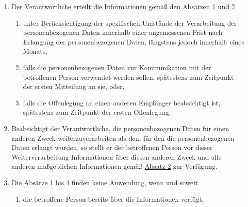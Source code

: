 \begin{enumerate}
\begin{enumerate}
  \end{enumerate}

  \item Der Verantwortliche erteilt die Informationen gemäß den Absätzen \hyperref[itm:14-1]{1} und \hyperref[itm:14-2]
  {2}
  \label{itm:14-3}

  \begin{enumerate}
  
    \item unter Berücksichtigung der spezifischen Umstände der Verarbeitung der personenbezogenen Daten innerhalb einer
     angemessenen Frist nach Erlangung der personenbezogenen Daten, längstens jedoch innerhalb eines Monats,
    \label{itm:14-3a}

    \item falls die personenbezogenen Daten zur Kommunikation mit der betroffenen Person verwendet werden sollen,
     spätestens zum Zeitpunkt der ersten Mitteilung an sie, oder,
    \label{itm:14-3b}

    \item falls die Offenlegung an einen anderen Empfänger beabsichtigt ist, spätestens zum Zeitpunkt der ersten
     Offenlegung.
    \label{itm:14-3c}

  \end{enumerate}

  \item Beabsichtigt der Verantwortliche, die personenbezogenen Daten für einen anderen Zweck weiterzuverarbeiten als
   den, für den die personenbezogenen Daten erlangt wurden, so stellt er der betroffenen Person vor dieser
   Weiterverarbeitung Informationen über diesen anderen Zweck und alle anderen maßgeblichen Informationen gemäß
   \hyperref[itm:14-2]{Absatz 2} zur Verfügung.
  \label{itm:14-4}

  \item Die Absätze \hyperref[itm:14-1]{1} bis \hyperref[itm:14-4]{4} finden keine Anwendung, wenn und soweit
  \label{itm:14-5}

  \begin{enumerate}
  
    \item die betroffene Person bereits über die Informationen verfügt,
    \label{itm:14-5a}


\end{enumerate}
\end{enumerate}
